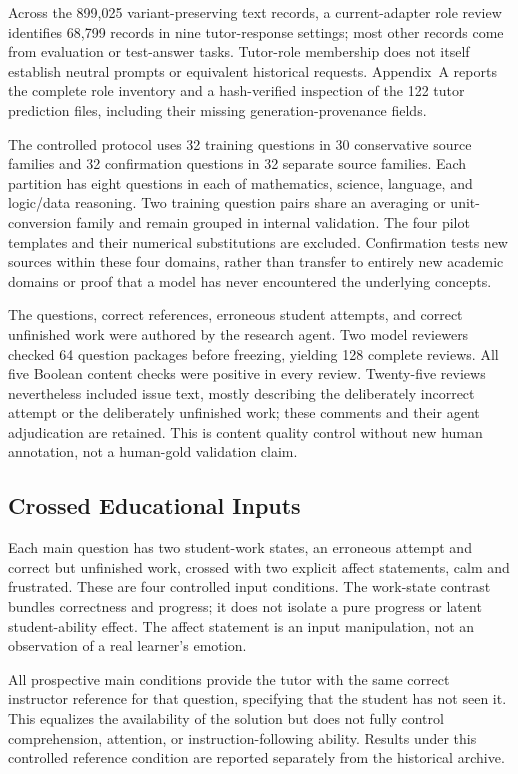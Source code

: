 Across the 899,025 variant-preserving text records, a current-adapter role review
identifies 68,799 records in nine tutor-response settings; most other records
come from evaluation or test-answer tasks. Tutor-role membership does not itself
establish neutral prompts or equivalent historical requests. Appendix~A reports
the complete role inventory and a hash-verified inspection of the 122 tutor
prediction files, including their missing generation-provenance fields.

The controlled protocol uses 32 training questions in 30 conservative source
families and 32 confirmation questions in 32 separate source families. Each
partition has eight questions in each of mathematics, science, language, and
logic/data reasoning. Two training question pairs share an averaging or unit-
conversion family and remain grouped in internal validation. The four pilot
templates and their numerical substitutions are excluded. Confirmation tests
new sources within these four domains, rather than transfer to entirely new
academic domains or proof that a model has never encountered the underlying
concepts.

The questions, correct references, erroneous student attempts, and correct
unfinished work were authored by the research agent. Two model reviewers
checked 64 question packages before freezing, yielding 128 complete reviews.
All five Boolean content checks were positive in every review. Twenty-five
reviews nevertheless included issue text, mostly describing the deliberately
incorrect attempt or the deliberately unfinished work; these comments and their
agent adjudication are retained. This is content quality control without new
human annotation, not a human-gold validation claim.

\subsection{Crossed Educational Inputs}

Each main question has two student-work states, an erroneous attempt and correct
but unfinished work, crossed with two explicit affect statements, calm and
frustrated. These are four controlled input conditions. The work-state contrast
bundles correctness and progress; it does not isolate a pure progress or latent
student-ability effect. The affect statement is an input manipulation, not an
observation of a real learner's emotion.

All prospective main conditions provide the tutor with the same correct
instructor reference for that question, specifying that the student has not
seen it. This equalizes the availability of the solution but does not fully
control comprehension, attention, or instruction-following ability. Results
under this controlled reference condition are reported separately from the
historical archive.

